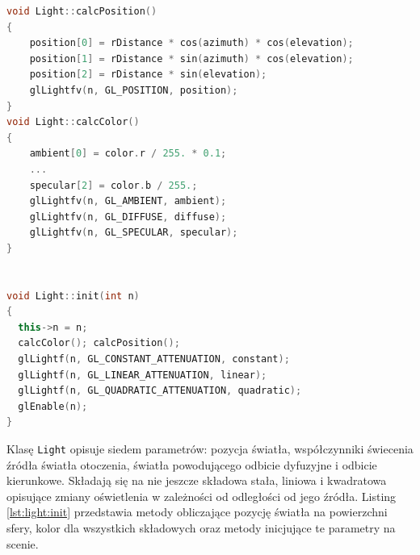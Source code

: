 \begin{lstlisting}[language=C++, caption=Metody inicjujące światło na scenie., label={lst:light:init}]
void Light::calcPosition()
{
    position[0] = rDistance * cos(azimuth) * cos(elevation);
    position[1] = rDistance * sin(azimuth) * cos(elevation);
    position[2] = rDistance * sin(elevation);
    glLightfv(n, GL_POSITION, position);
}
void Light::calcColor()
{
    ambient[0] = color.r / 255. * 0.1;
    ...
    specular[2] = color.b / 255.;
    glLightfv(n, GL_AMBIENT, ambient);
    glLightfv(n, GL_DIFFUSE, diffuse);
    glLightfv(n, GL_SPECULAR, specular);
}


void Light::init(int n)
{
  this->n = n;
  calcColor(); calcPosition();
  glLightf(n, GL_CONSTANT_ATTENUATION, constant);
  glLightf(n, GL_LINEAR_ATTENUATION, linear);
  glLightf(n, GL_QUADRATIC_ATTENUATION, quadratic);
  glEnable(n);
}
\end{lstlisting}


Klasę \lstinline{Light} opisuje siedem parametrów: pozycja światła, współczynniki świecenia źródła światła otoczenia, światła powodującego odbicie dyfuzyjne i odbicie kierunkowe. Składają się na nie jeszcze składowa stała, liniowa i kwadratowa opisujące zmiany oświetlenia w zależności od odległości od jego źródła. Listing \ref{lst:light:init} przedstawia metody obliczające pozycję światła na powierzchni sfery, kolor dla wszystkich składowych oraz metody inicjujące te parametry na scenie.

